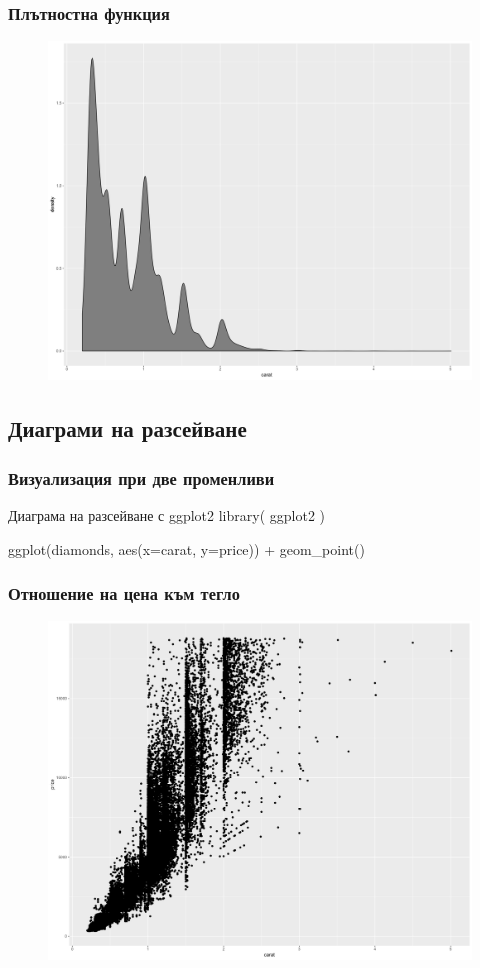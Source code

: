 \documentclass{beamer}
\begin{document}
\begin{frame}
\frametitle{Плътностна функция}
\begin{figure}[]\includegraphics[width=\textwidth,height=0.75\textheight]{pic0032}\end{figure}
\end{frame}

\subsection{Диаграми на разсейване}

\begin{frame}
\frametitle{Визуализация при две променливи}
\begin{block}{Диаграма на разсейване с ggplot2}
library( ggplot2 )

ggplot(diamonds, aes(x=carat, y=price)) + geom\_point()
\end{block}
\end{frame}

\begin{frame}
\frametitle{Отношение на цена към тегло}
\begin{figure}[]\includegraphics[width=\textwidth,height=0.75\textheight]{pic0033}\end{figure}
\end{frame}
\end{document}
